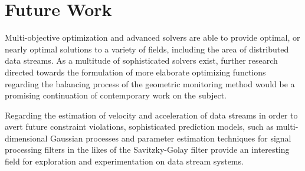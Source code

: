 \section{Future Work} \label{sec:concFuture-future}

Multi-objective optimization and advanced solvers are able to provide optimal, or nearly optimal solutions to a variety of fields, including the area of distributed data streams. As a multitude of sophisticated solvers exist, further research directed towards the formulation of more elaborate optimizing functions regarding the balancing process of the geometric monitoring method would be a promising continuation of contemporary work on the subject. 

Regarding the estimation of velocity and acceleration of data streams in order to avert future constraint violations, sophisticated prediction models, such as multi-dimensional Gaussian processes and parameter estimation techniques for signal processing filters in the likes of the Savitzky-Golay filter provide an interesting field for exploration and experimentation on data stream systems.
